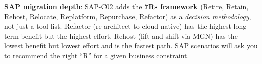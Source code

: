 \begin{sapdepth}
\textbf{SAP migration depth}: SAP-C02 adds the \textbf{7Rs framework} (Retire, Retain, Rehost,
Relocate, Replatform, Repurchase, Refactor) as a \emph{decision methodology}, not just a tool list.
Refactor (re-architect to cloud-native) has the highest long-term benefit but the highest effort.
Rehost (lift-and-shift via MGN) has the lowest benefit but lowest effort and is the fastest path.
SAP scenarios will ask you to recommend the right ``R'' for a given business constraint.
\end{sapdepth}
